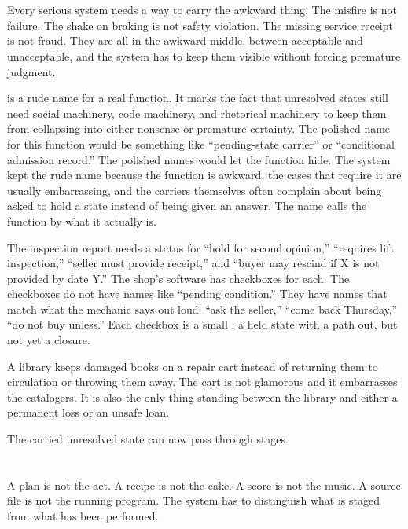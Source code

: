 \section{}
\label{se:gungan}

Every serious system needs a way to carry the awkward thing. The misfire
is not failure. The shake on braking is not safety violation. The
missing service receipt is not fraud. They are all in the awkward
middle, between acceptable and unacceptable, and the system has to keep
them visible without forcing premature judgment.

 is a rude name for a real function. It marks the fact that
unresolved states still need social machinery, code machinery, and
rhetorical machinery to keep them from collapsing into either nonsense
or premature certainty. The polished name for this function would be
something like ``pending-state carrier'' or ``conditional admission
record.'' The polished names would let the function hide. The system
kept the rude name because the function is awkward, the cases that
require it are usually embarrassing, and the carriers themselves often
complain about being asked to hold a state instead of being given an
answer. The name calls the function by what it actually is.

The inspection report needs a status for ``hold for second opinion,''
``requires lift inspection,'' ``seller must provide receipt,'' and
``buyer may rescind if X is not provided by date Y.'' The shop's
software has checkboxes for each. The checkboxes do not have names like
``pending condition.'' They have names that match what the mechanic says
out loud: ``ask the seller,'' ``come back Thursday,'' ``do not buy
unless.'' Each checkbox is a small : a held state with a
path out, but not yet a closure.

A library keeps damaged books on a repair cart instead of returning them
to circulation or throwing them away. The cart is not glamorous and it
embarrasses the catalogers. It is also the only thing standing between
the library and either a permanent loss or an unsafe loan.

The carried unresolved state can now pass through stages.

\section{}
\label{se:source}

A plan is not the act. A recipe is not the cake. A score is not the
music. A source file is not the running program. The system has to
distinguish what is staged from what has been performed.

